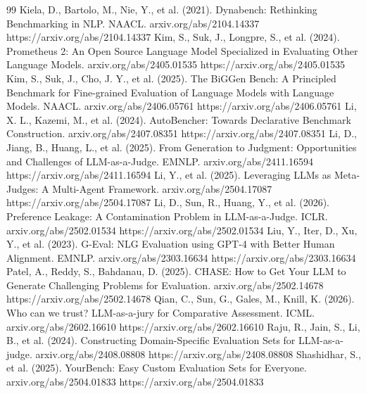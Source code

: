 \begin{thebibliography}{99}
\label{r14} Kiela, D., Bartolo, M., Nie, Y., et al. (2021). Dynabench: Rethinking Benchmarking in NLP. NAACL. arxiv.org/abs/2104.14337 https://arxiv.org/abs/2104.14337
\label{r3} Kim, S., Suk, J., Longpre, S., et al. (2024). Prometheus 2: An Open Source Language Model Specialized
    in Evaluating Other Language Models. arxiv.org/abs/2405.01535 https://arxiv.org/abs/2405.01535
\label{r7} Kim, S., Suk, J., Cho, J. Y., et al. (2025). The BiGGen Bench: A Principled Benchmark for Fine-grained
    Evaluation of Language Models with Language Models. NAACL. arxiv.org/abs/2406.05761 https://arxiv.org/abs/2406.05761
\label{r9} Li, X. L., Kazemi, M., et al. (2024). AutoBencher: Towards Declarative Benchmark Construction. arxiv.org/abs/2407.08351 https://arxiv.org/abs/2407.08351
\label{r20} Li, D., Jiang, B., Huang, L., et al. (2025). From Generation to Judgment: Opportunities and
    Challenges of LLM-as-a-Judge. EMNLP. arxiv.org/abs/2411.16594 https://arxiv.org/abs/2411.16594
\label{r26} Li, Y., et al. (2025). Leveraging LLMs as Meta-Judges: A Multi-Agent Framework. arxiv.org/abs/2504.17087 https://arxiv.org/abs/2504.17087
\label{r15} Li, D., Sun, R., Huang, Y., et al. (2026). Preference Leakage: A Contamination Problem in
    LLM-as-a-Judge. ICLR. arxiv.org/abs/2502.01534 https://arxiv.org/abs/2502.01534
\label{r2} Liu, Y., Iter, D., Xu, Y., et al. (2023). G-Eval: NLG Evaluation using GPT-4 with Better Human
    Alignment. EMNLP. arxiv.org/abs/2303.16634 https://arxiv.org/abs/2303.16634
\label{r30} Patel, A., Reddy, S., Bahdanau, D. (2025). CHASE: How to Get Your LLM to Generate Challenging
    Problems for Evaluation. arxiv.org/abs/2502.14678 https://arxiv.org/abs/2502.14678
\label{r27} Qian, C., Sun, G., Gales, M., Knill, K. (2026). Who can we trust? LLM-as-a-jury for Comparative
    Assessment. ICML. arxiv.org/abs/2602.16610 https://arxiv.org/abs/2602.16610
\label{r25} Raju, R., Jain, S., Li, B., et al. (2024). Constructing Domain-Specific Evaluation Sets for
    LLM-as-a-judge. arxiv.org/abs/2408.08808 https://arxiv.org/abs/2408.08808
\label{r11} Shashidhar, S., et al. (2025). YourBench: Easy Custom Evaluation Sets for Everyone. arxiv.org/abs/2504.01833 https://arxiv.org/abs/2504.01833

\end{thebibliography}
